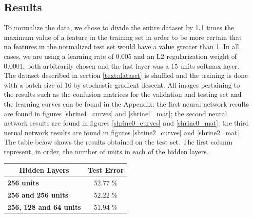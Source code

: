 \begin{multicols}{2}
\subsection{Results}
To normalize the data, we chose to divide the entire dataset by 1.1 times the maximum value of a feature in the training set in order to be more certain that no features in the normalized test set would have a value greater than 1. In all cases, we are using a learning rate of 0.005 and an L2 regularization weight of 0.0001, both arbitrarily chosen and the last layer was a 15 units softmax layer. The dataset described in section \ref{text:dataset} is shuffled and the training is done with a batch size of 16 by stochastic gradient descent. All images pertaining to the results such as the confusion matrices for the validation and testing set and the learning curves can be found in the Appendix: the first neural network results are found in figures \ref{shrine1_curves} and \ref{shrine1_mat}; the second neural network results are found in figures \ref{shrine0_curves} and \ref{shrine0_mat}; the third nerual network results are found in figures \ref{shrine2_curves} and \ref{shrine2_mat}. The table below shows the results obtained on the test set. The first column represent, in order, the number of units in each of the hidden layers. 

\begin{center}
\begin{tabular}{lc}
\toprule
\multicolumn{1}{c}{\textbf{Hidden Layers}} & \textbf{Test Error} \\
\midrule
\textbf{256 units}                         &   52.77 \%          \\
\textbf{256 and 256 units}                 &   52.22 \%          \\
\textbf{256, 128 and 64 units}             &   51.94 \%       \\ \bottomrule
\end{tabular}
\end{center}


\end{multicols}
